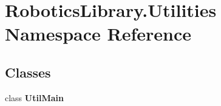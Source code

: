 \hypertarget{namespace_robotics_library_1_1_utilities}{}\section{Robotics\+Library.\+Utilities Namespace Reference}
\label{namespace_robotics_library_1_1_utilities}
\subsection*{Classes}
\begin{DoxyCompactItemize}
\item 
class {\bfseries Util\+Main}
\end{DoxyCompactItemize}
